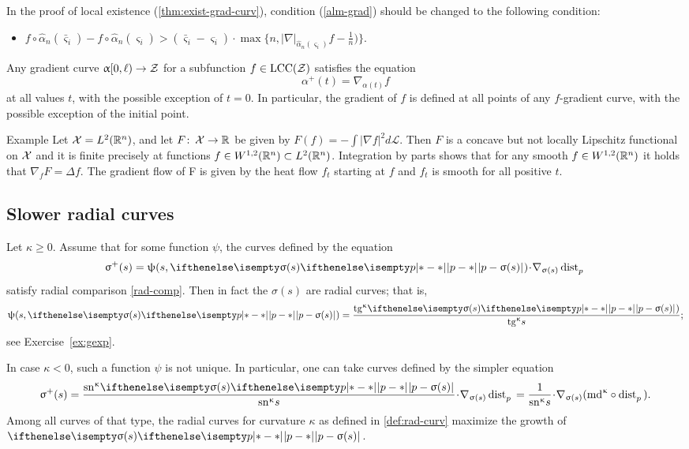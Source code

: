 \medskip

In the proof of local existence (\ref{thm:exist-grad-curv}), condition (\ref{alm-grad})
should be changed to the following condition:
\begin{itemize}

\item[{(\ref{alm-grad})}$'$]
$f\circ\hat\alpha_n(\bar\varsigma_i)-f\circ\hat\alpha_n(\varsigma_i)
>
(\bar\varsigma_i-\varsigma_i)
\cdot
\max\{n,|\nabla|_{\hat\alpha_n(\varsigma_i)}f-\tfrac{1}{n})\}.$
\end{itemize}

Any gradient curve $\alpha[0,\ell)\to\spc{Z}$
for a subfunction
$f\in \LSCSC(\spc{Z})$
satisfies the equation
\[\alpha^+(t)=\nabla_{\alpha(t)} f\]
at all values $t$, with the possible exception of $t=0$.
In particular, the gradient of $f$ is defined at all points of any 
$f$-gradient curve, with the possible exception of the initial point.

\begin{thm}{Example}
Let $\mathcal{X}=L^2(\mathbb{R}^n)$, and let $F\co \spc{X}\to \R$ be given  by $F(f)=-\int|\nabla f|^2d\mathcal L$.
Then $F$ is a concave but not locally Lipschitz functional on $\mathcal{X}$ and it is finite precisely at functions $f\in W^{1,2}(\R^n)\subset L^2(\R^n)$.
Integration by parts shows that for any smooth $f\in W^{1,2}(\R^n)$ it holds that $\nabla_fF=\Delta f$.
The gradient flow of F is given by the heat flow $f_t$ starting at $f$ and $f_t$ is smooth for all positive $t$.
\end{thm}

\subsection*{Slower radial curves}
Let $\kappa\ge 0$. 
Assume that for some function $\psi$, the curves defined by the equation 
\[\sigma^+(s)=\psi(s,\dist{p}{\sigma(s)}{})\cdot\nabla_{\sigma(s)}\distfun{p}{}{}\]
satisfy radial comparison \ref{rad-comp}.
Then in fact the $\sigma(s)$ are radial curves; 
that is, 
\[\psi(s,\dist{p}{\sigma(s)}{})= \frac{\tang\kappa\dist[{{}}]{p}{\sigma(s)}{})}{\tang\kappa s};\]
see Exercise~\ref{ex:gexp}.

In case $\kappa<0$, such a function $\psi$ is not unique.
In particular, one can take curves defined by the simpler equation
\[\sigma^+(s)
=
\frac{\sn\kappa \dist[{{}}]{p}{\sigma(s)}{}}{\sn\kappa s}\cdot\nabla_{\sigma(s)}\distfun{p}{}{}
=
\frac{1}{\sn\kappa s}\cdot\nabla_{\sigma(s)}(\md\kappa\circ\distfun{p}{}{}).\]
Among all curves of that type, the radial curves for curvature $\kappa$ 
as defined in \ref{def:rad-curv} maximize the growth of $\dist{p}{\sigma(s)}{}$.




